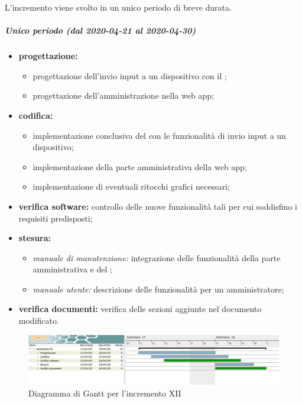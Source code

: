 				L'incremento viene svolto in un unico periodo di breve durata.
				
				\subparagraph{Unico periodo (dal 2020-04-21 al 2020-04-30)}
				
					\begin{itemize}
						\item \textbf{progettazione:} 
						\begin{itemize}
							\item progettazione dell'invio input a un dispositivo con il ;
							\item progettazione dell'amministrazione nella web app;
						\end{itemize}
						\item \textbf{codifica:} 
						\begin{itemize}
							\item implementazione conclusiva del  con le funzionalità di invio input a un dispositivo; 
							\item implementazione della parte amministrativa della web app;
							\item implementazione di eventuali ritocchi grafici necessari;
						\end{itemize}
						\item \textbf{verifica software:} controllo delle nuove funzionalità tali per cui soddisfino i requisiti predisposti;
						\item \textbf{stesura:} 
						\begin{itemize}
							\item \textit{manuale di manutenzione:} integrazione delle funzionalità della parte amministrativa e del ;
							\item \textit{manuale utente:} descrizione delle funzionalità per un amministratore;
						\end{itemize}
						\item \textbf{verifica documenti:} verifica delle sezioni aggiunte nel documento modificato.
					\end{itemize} 			

		\begin{landscape}
          \begin{figure}[H]
            \centering
            \includegraphics[width=\linewidth]{images/gantt/incrementoXII} %
            \caption{Diagramma di Gantt per l'incremento XII}
          \end{figure}		
		\end{landscape}
	

